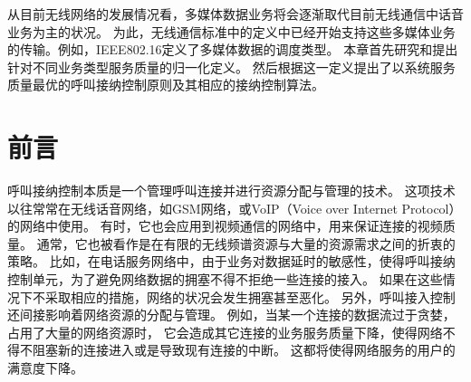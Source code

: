 \graphicspath{ {../body/cacop_figures/}}
\label{chap_cacop}

从目前无线网络的发展情况看，多媒体数据业务将会逐渐取代目前无线通信中话音业务为主的状况。
为此，无线通信标准中的定义中已经开始支持这些多媒体业务的传输。例如，IEEE802.16定义了多媒体数据的调度类型。
本章首先研究和提出针对不同业务类型服务质量的归一化定义。
然后根据这一定义提出了以系统服务质量最优的呼叫接纳控制原则及其相应的接纳控制算法。

\section{前言}
呼叫接纳控制本质是一个管理呼叫连接并进行资源分配与管理的技术。
这项技术以往常常在无线话音网络，如GSM网络，或VoIP（Voice over Internet Protocol）的网络中使用\cite{Perros1996}\cite{Mase2004}。
有时，它也会应用到视频通信的网络中，用来保证连接的视频质量\cite{Systems_2001}\cite{Y-G-Fang.TVT.2002}\cite{Y-Xiao.IEICE.TC.2001}。
通常，它也被看作是在有限的无线频谱资源与大量的资源需求之间的折衷的策略。
比如，在电话服务网络中，由于业务对数据延时的敏感性，使得呼叫接纳控制单元，为了避免网络数据的拥塞不得不拒绝一些连接的接入。
如果在这些情况下不采取相应的措施，网络的状况会发生拥塞甚至恶化。
另外，呼叫接入控制还间接影响着网络资源的分配与管理。
例如，当某一个连接的数据流过于贪婪，占用了大量的网络资源时，
它会造成其它连接的业务服务质量下降，使得网络不得不阻塞新的连接进入或是导致现有连接的中断。
这都将使得网络服务的用户的满意度下降。

